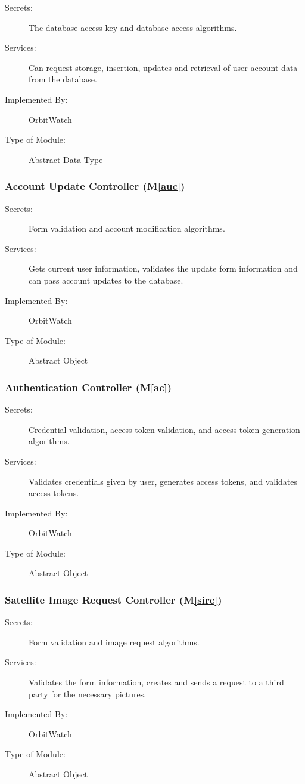 \documentclass[12pt, titlepage]{article}
\newcommand{\mref}[1]{M\ref{#1}}
\begin{document}
\begin{description}
\item[Secrets:] The database access key and database access algorithms.
\item[Services:] Can request storage, insertion, updates and retrieval of user account data from the database.
\item[Implemented By:] OrbitWatch
\item[Type of Module:] Abstract Data Type
\end{description}

\subsubsection{Account Update Controller (\mref{auc})}

\begin{description}
\item[Secrets:] Form validation and account modification algorithms.
\item[Services:] Gets current user information, validates the update form information and can pass account updates to the database.
\item[Implemented By:] OrbitWatch
\item[Type of Module:] Abstract Object
\end{description}

\subsubsection{Authentication Controller (\mref{ac})}

\begin{description}
\item[Secrets:] Credential validation, access token validation, and access token generation algorithms.
\item[Services:] Validates credentials given by user, generates access tokens, and validates access tokens.
\item[Implemented By:] OrbitWatch
\item[Type of Module:] Abstract Object
\end{description}

\subsubsection{Satellite Image Request Controller (\mref{sirc})}

\begin{description}
\item[Secrets:] Form validation and image request algorithms.
\item[Services:] Validates the form information, creates and sends a request to a third party for the necessary pictures.
\item[Implemented By:] OrbitWatch
\item[Type of Module:] Abstract Object
\end{description}
\end{document}
